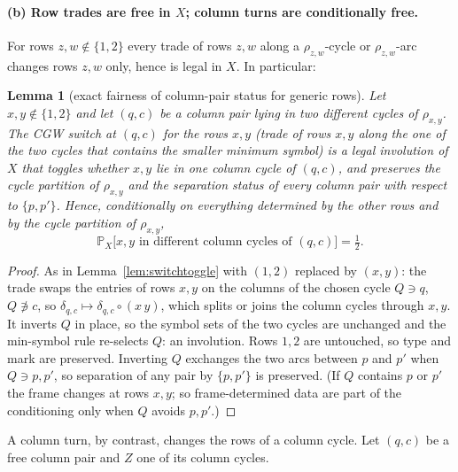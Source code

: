 \documentclass[11pt]{article}
\newtheorem{lemma}[theorem]{Lemma}
\theoremstyle{definition}
\renewcommand{\Pr}{\mathbb{P}}
\begin{document}
\paragraph{(b) Row trades are free in $X$; column turns are
conditionally free.}  For rows $z,w\notin\{1,2\}$ every trade of rows
$z,w$ along a $\rho_{z,w}$-cycle or $\rho_{z,w}$-arc changes rows
$z,w$ only, hence is legal in $X$.  In particular:

\begin{lemma}[exact fairness of column-pair status for generic rows]
\label{lem:rowfair}
Let $x,y\notin\{1,2\}$ and let $(q,c)$ be a column pair lying in two
different cycles of $\rho_{x,y}$.  The CGW switch at $(q,c)$ for the
rows $x,y$ (trade of rows $x,y$ along the one of the two cycles that
contains the smaller minimum symbol) is a legal involution of $X$
that toggles whether $x,y$ lie in one column cycle of $(q,c)$, and
preserves the cycle partition of $\rho_{x,y}$ and the separation
status of every column pair with respect to $\{p,p'\}$.  Hence,
conditionally on everything determined by the other rows and by the
cycle partition of $\rho_{x,y}$,
\[
\Pr_X\bigl[x,y\text{ in different column cycles of }(q,c)\bigr]=\tfrac12 .
\]
\end{lemma}

\begin{proof}
As in Lemma~\ref{lem:switchtoggle} with $(1,2)$ replaced by $(x,y)$:
the trade swaps the entries of rows $x,y$ on the columns of the chosen
cycle $Q\ni q$, $Q\not\ni c$, so $\delta_{q,c}\mapsto\delta_{q,c}\circ(x\,y)$,
which splits or joins the column cycles through $x,y$.  It inverts $Q$
in place, so the symbol sets of the two cycles are unchanged and the
min-symbol rule re-selects $Q$: an involution.  Rows $1,2$ are
untouched, so type and mark are preserved.  Inverting $Q$ exchanges the
two arcs between $p$ and $p'$ when $Q\ni p,p'$, so separation of any
pair by $\{p,p'\}$ is preserved.  (If $Q$ contains $p$ or $p'$ the
frame changes at rows $x,y$; so frame-determined data are part of the
conditioning only when $Q$ avoids $p,p'$.)
\end{proof}

A column turn, by contrast, changes the rows of a column cycle.  Let
$(q,c)$ be a free column pair and $Z$ one of its column cycles.
\end{document}
